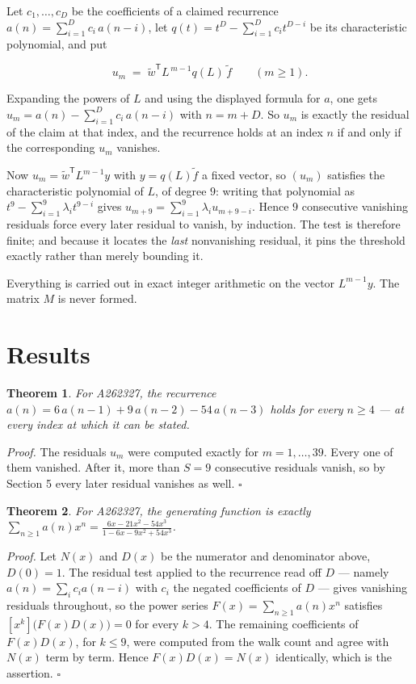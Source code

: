 \documentclass[11pt]{article}
\newtheorem{theorem}{Theorem}
\theoremstyle{definition}
\begin{document}
Let $c_1,\dots,c_D$ be the coefficients of a claimed recurrence $a(n) = \sum_{i=1}^{D} c_i\,a(n-i)$, let $q(t) = t^{D} - \sum_{i=1}^{D} c_i t^{D-i}$ be its characteristic polynomial, and put

\[u_m \;=\; \tilde w^{\mathsf T} L^{\,m-1} q(L)\,\tilde f \qquad (m \ge 1).\]

Expanding the powers of $L$ and using the displayed formula for $a$, one gets $u_m = a(n) - \sum_{i=1}^{D} c_i\,a(n-i)$ with $n = m + D$. So $u_m$ is exactly the residual of the claim at that index, and the recurrence holds at an index $n$ if and only if the corresponding $u_m$ vanishes.

Now $u_m = \tilde w^{\mathsf T} L^{m-1} y$ with $y = q(L)\tilde f$ a fixed vector, so $(u_m)$ satisfies the characteristic polynomial of $L$, of degree $9$: writing that polynomial as $t^{9} - \sum_{i=1}^{9} \lambda_i t^{9-i}$ gives $u_{m+9} = \sum_{i=1}^{9} \lambda_i u_{m+9-i}$. Hence $9$ consecutive vanishing residuals force every later residual to vanish, by induction. The test is therefore finite; and because it locates the {\itshape last} nonvanishing residual, it pins the threshold exactly rather than merely bounding it.

Everything is carried out in exact integer arithmetic on the vector $L^{m-1}y$. The matrix $M$ is never formed.

\section{Results}

\begin{theorem} For A262327, the recurrence $a(n) = 6\,a(n-1) + 9\,a(n-2) - 54\,a(n-3)$ holds for every $n \ge 4$ --- at every index at which it can be stated.\end{theorem}

{\itshape Proof.} The residuals $u_m$ were computed exactly for $m = 1,\dots,39$. Every one of them vanished. After it, more than $S = 9$ consecutive residuals vanish, so by Section 5 every later residual vanishes as well. $\square$

\begin{theorem} For A262327, the generating function is exactly $\sum_{n\ge 1} a(n)x^n = \frac{6x - 21x^{2} - 54x^{3}}{1 - 6x - 9x^{2} + 54x^{3}}$.\end{theorem}

{\itshape Proof.} Let $N(x)$ and $D(x)$ be the numerator and denominator above, $D(0)=1$. The residual test applied to the recurrence read off $D$ --- namely $a(n) = \sum_i c_i a(n-i)$ with $c_i$ the negated coefficients of $D$ --- gives vanishing residuals throughout, so the power series $F(x)=\sum_{n\ge 1}a(n)x^n$ satisfies $[x^k]\bigl(F(x)D(x)\bigr) = 0$ for every $k > 4$. The remaining coefficients of $F(x)D(x)$, for $k \le 9$, were computed from the walk count and agree with $N(x)$ term by term. Hence $F(x)D(x) = N(x)$ identically, which is the assertion. $\square$
\end{document}
